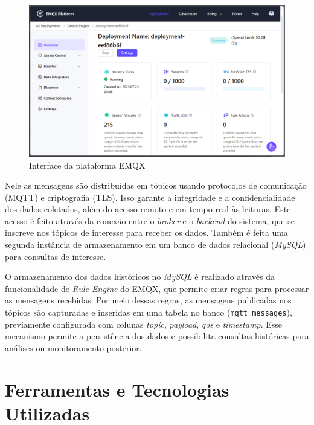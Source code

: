 \begin{figure}[!htb] \centering
  \caption{Interface da plataforma EMQX} \label{figura:emqx}
  \begin{varwidth}{\linewidth}
    \includegraphics[width=16cm]{figuras/emqx.png}
  \end{varwidth}
\end{figure}

Nele as mensagens são distribuídas em tópicos usando protocolos de comunicação (MQTT) e criptografia (TLS). Isso garante a integridade e a confidencialidade dos dados coletados, além do acesso remoto e em tempo real às leituras. Este acesso é feito através da conexão entre o \textit{broker} e o \textit{backend} do sistema, que se inscreve nos tópicos de interesse para receber os dados. Também é feita uma segunda instância de armazenamento em um banco de dados relacional (\textit{MySQL}) para consultas de interesse. 

O armazenamento dos dados históricos no \textit{MySQL} é realizado através da funcionalidade de \textit{Rule Engine} do EMQX, que permite criar regras para processar as mensagens recebidas. Por meio dessas regras, as mensagens publicadas nos tópicos são capturadas e inseridas em uma tabela no banco (\texttt{mqtt\_messages}), previamente configurada com colunas \textit{topic}, \textit{payload}, \textit{qos} e \textit{timestamp}. Esse mecanismo permite a persistência dos dados e possibilita consultas históricas para análises ou monitoramento posterior.

\section{Ferramentas e Tecnologias Utilizadas}

